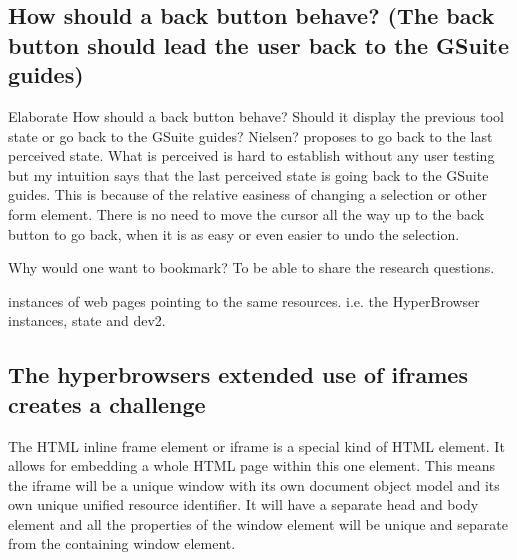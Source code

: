 \documentclass[english]{ifimaster}
\begin{document}
\subsection{How should a back button behave? (The back button should lead the user back to the GSuite guides)} Elaborate
\label{sec:backButton}
How should a back button behave? Should it display the previous tool state or go back to the GSuite guides? Nielsen? proposes to go back to the last perceived state. What is perceived is hard to establish without any user testing but my intuition says that the last perceived state is going back to the GSuite guides. This is because of the relative easiness of changing a selection or other form element. There is no need to move the cursor all the way up to the back button to go back, when it is as easy or even easier to undo the selection. 


Why would one want to bookmark? To be able to share the research questions.




instances of web pages pointing to the same resources. i.e. the HyperBrowser instances, state and dev2.



\subsection{The hyperbrowsers extended use of iframes creates a challenge}
\label{sec:iframes}
The HTML inline frame element or iframe is a special kind of HTML element. It allows for embedding a whole HTML page within this one element. This means the iframe will be a unique window with its own document object model and its own unique unified resource identifier. It will have a separate head and body element and all the properties of the window element will be unique and separate from the containing window element. 
\end{document}
